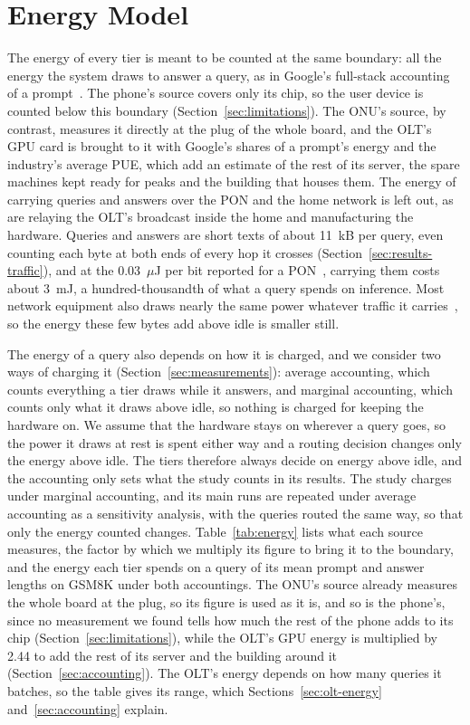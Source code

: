 \documentclass[cic,dipl,english]{infufrgs}
\begin{document}
\section{Energy Model}
\label{sec:energy-model}

The energy of every tier is meant to be counted at the same boundary: all the energy the
system draws to answer a query, as in Google's full-stack accounting of a
prompt~\cite{elsworth2025measuring}. The phone's source covers only its chip, so the user
device is counted below this boundary (Section~\ref{sec:limitations}). The ONU's source, by
contrast, measures it directly at the plug of the whole board, and the OLT's GPU card is
brought to it with Google's shares of a prompt's energy and the industry's average PUE,
which add an estimate of the rest of its server, the spare machines kept ready for peaks
and the building that houses them. The energy of carrying queries and answers over the PON
and the home network is left out, as are relaying the OLT's broadcast inside the home and
manufacturing the hardware. Queries and answers are short texts of about 11~kB per query, even
counting each byte at both ends of every hop it crosses (Section~\ref{sec:results-traffic}), and
at the 0.03~$\mu$J per bit reported for a PON~\cite{lorincz2025comprehensive}, carrying them costs
about 3~mJ, a hundred-thousandth of what a query spends on inference. Most network equipment also
draws nearly the same power whatever traffic it carries~\cite{krug2014understanding}, so the
energy these few bytes add above idle is smaller still.

The energy of a query also depends on how it is charged, and we consider two ways of
charging it (Section~\ref{sec:measurements}): average accounting, which counts everything a
tier draws while it answers, and marginal accounting, which counts only what it draws above idle, so
nothing is charged for keeping the hardware on. We assume that the hardware stays on wherever a
query goes, so the power it draws at rest is spent either way and a routing decision changes
only the energy above idle. The tiers therefore always decide on energy above idle, and
the accounting only sets what the study counts in its results. The study charges under marginal accounting, and its main runs are repeated under
average accounting as a sensitivity analysis, with the queries routed the same way, so that only
the energy counted changes. Table~\ref{tab:energy} lists
what each source measures, the factor by which we multiply its figure to bring it to the
boundary, and the energy each tier spends on a query of its mean prompt and answer lengths
on GSM8K under both accountings. The ONU's source already measures the whole board at the
plug, so its figure is used as it is, and so is the phone's, since no measurement we found
tells how much the rest of the phone adds to its chip (Section~\ref{sec:limitations}), while
the OLT's GPU energy is multiplied by 2.44 to add the rest of its server and the building
around it (Section~\ref{sec:accounting}). The OLT's energy depends on how many queries it batches, so the table gives its
range, which Sections~\ref{sec:olt-energy} and~\ref{sec:accounting} explain.
\end{document}
